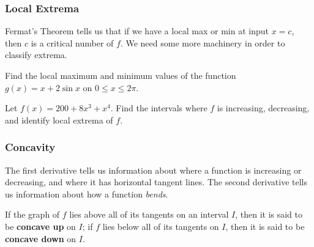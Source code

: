 \documentclass[notes]{subfiles}
\begin{document}
	\subsubsection*{Local Extrema}
		Fermat's Theorem tells us that if we have a local max or min at input $x = c$, then $c$ is a critical number of $f$.  We need some more machinery in order to classify extrema.   
		\begin{thm}
		\end{thm}

		\begin{ex}
			Find the local maximum and minimum values of the function $g(x) = x + 2\sin x$ on $0\leq x\leq 2\pi$.
		\end{ex}
			\newpage

		\begin{ex}
			Let $f(x) = 200 + 8x^3 + x^4$.  Find the intervals where $f$ is increasing, decreasing, and identify local extrema of $f$.  
		\end{ex}
		
			
	\subsubsection*{Concavity}
		The first derivative tells us information about where a function is increasing or decreasing, and where it has horizontal tangent lines.  The second derivative tells us information about how a function \emph{bends}.
		\begin{defn}
			If the graph of $f$ lies above all of its tangents on an interval $I$, then it is said to be \textbf{concave up} on $I$; if $f$ lies below all of its tangents on $I$, then it is said to be \textbf{concave down} on $I$.  
		\end{defn}
		
\end{document}
